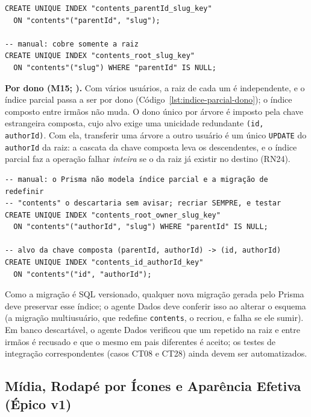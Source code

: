 \begin{lstlisting}[caption={Índice parcial da raiz (trecho da migração inicial)}, label={lst:indice-parcial}]
CREATE UNIQUE INDEX "contents_parentId_slug_key"
  ON "contents"("parentId", "slug");

-- manual: cobre somente a raiz
CREATE UNIQUE INDEX "contents_root_slug_key"
  ON "contents"("slug") WHERE "parentId" IS NULL;
\end{lstlisting}

\textbf{Por dono (M15; ).} Com vários usuários, a raiz de cada um é independente, e o índice parcial passa a ser por dono (Código~\ref{lst:indice-parcial-dono}); o índice composto entre irmãos não muda. O dono único por árvore é imposto pela chave estrangeira composta, cujo alvo exige uma unicidade redundante \texttt{(id, authorId)}. Com ela, transferir uma árvore a outro usuário é um único \texttt{UPDATE} do \texttt{authorId} da raiz: a cascata da chave composta leva os descendentes, e o índice parcial faz a operação falhar \emph{inteira} se o  da raiz já existir no destino (RN24).

\begin{lstlisting}[caption={Índices do modelo multiusuário (trecho da migração do merge M-012)}, label={lst:indice-parcial-dono}]
-- manual: o Prisma não modela índice parcial e a migração de redefinir
-- "contents" o descartaria sem avisar; recriar SEMPRE, e testar
CREATE UNIQUE INDEX "contents_root_owner_slug_key"
  ON "contents"("authorId", "slug") WHERE "parentId" IS NULL;

-- alvo da chave composta (parentId, authorId) -> (id, authorId)
CREATE UNIQUE INDEX "contents_id_authorId_key"
  ON "contents"("id", "authorId");
\end{lstlisting}

Como a migração é SQL versionado, qualquer nova migração gerada pelo Prisma deve preservar esse índice; o agente Dados deve conferir isso ao alterar o esquema (a migração multiusuário, que redefine \texttt{contents}, o recriou, e  falha se ele sumir). Em banco descartável, o agente Dados verificou que um  repetido na raiz e entre irmãos é recusado e que o mesmo  em pais diferentes é aceito; os testes de integração correspondentes (casos CT08 e CT28) ainda devem ser automatizados.

\subsection{Mídia, Rodapé por Ícones e Aparência Efetiva (Épico v1)}\label{sec:arq-dados-v1}

